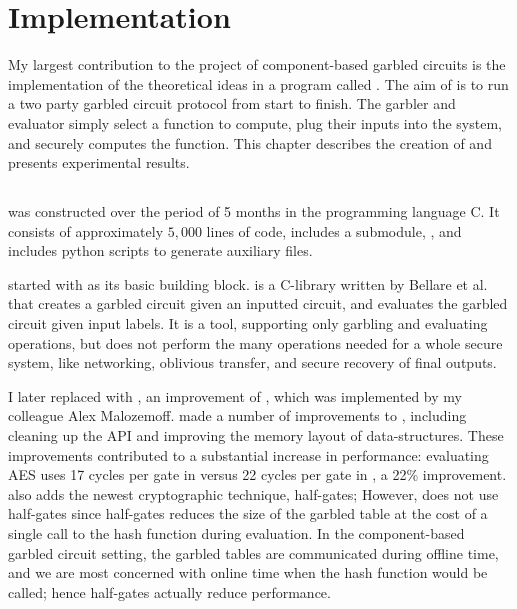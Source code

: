 
\chapter{Implementation}

My largest contribution to the project of component-based garbled circuits is the implementation of the theoretical ideas in a program called \CompGC. 
The aim of \CompGC is to run a two party garbled circuit protocol from start to finish. 
The garbler and evaluator simply select a function to compute, plug their inputs into the system, and \CompGC securely computes the function.
This chapter describes the creation of \CompGC and presents experimental results. 

\section{\CompGC}

\CompGC was constructed over the period of 5 months in the programming language C. 
It consists of approximately $5,000$ lines of code, includes a submodule, \LibGarble, and includes python scripts to generate auxiliary files. 

\CompGC started with \JustGarble as its basic building block.
\JustGarble is a C-library written by Bellare et al. \cite{justgarble} that creates a garbled circuit given an inputted circuit, and evaluates the garbled circuit given input labels. 
It is a tool, supporting only garbling and evaluating operations, but does not perform the many operations needed for a whole secure system, like networking, oblivious transfer, and secure recovery of final outputs. 

I later replaced \JustGarble with \LibGarble, an improvement of \JustGarble, which was implemented by my colleague Alex Malozemoff.
\LibGarble made a number of improvements to \JustGarble, including cleaning up the API and improving the memory layout of  data-structures.
These improvements contributed to a substantial increase in performance: evaluating AES uses 17 cycles per gate in \LibGarble versus 22 cycles per gate in \JustGarble, a 22\% improvement. 
\LibGarble also adds the newest cryptographic technique, half-gates; However, \CompGC does not use half-gates since half-gates reduces the size of the garbled table at the cost of a single call to the hash function during evaluation. 
In the component-based garbled circuit setting, the garbled tables are communicated during offline time, and we are most concerned with online time when the hash function would be called; hence half-gates actually reduce performance.


